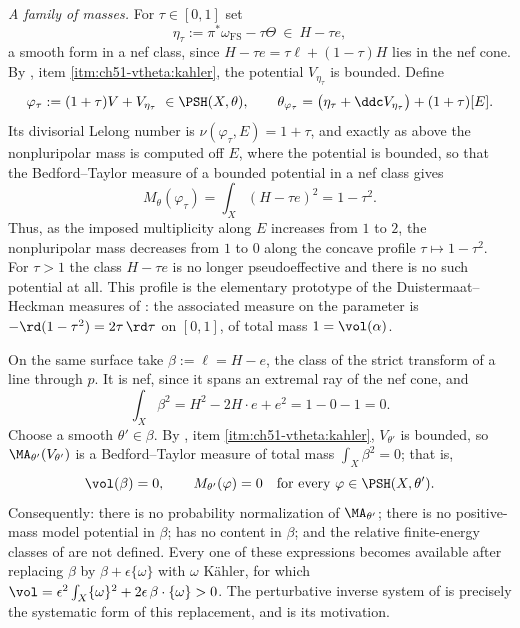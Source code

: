 \begin{example}
\emph{A family of masses.}  For \(\tau\in[0,1]\) set
\[
 \eta_\tau:=\pi^*\omega_{\mathrm{FS}}-\tau\Theta
 \ \in\ H-\tau e ,
\]
a smooth form in a nef class, since \(H-\tau e=\tau\ell+(1-\tau)H\) lies
in the nef cone.  By , item
\cref{itm:ch51-vtheta:kahler}, the potential \(V_{\eta_\tau}\) is bounded.
Define
\[
 \varphi_\tau:=(1+\tau)V+V_{\eta_\tau}\ \in\PSH(X,\theta),
 \qquad
 \theta_{\varphi_\tau}
 =\bigl(\eta_\tau+\ddc V_{\eta_\tau}\bigr)+(1+\tau)[E] .
\]
Its divisorial Lelong number is \(\nu(\varphi_\tau,E)=1+\tau\), and
exactly as above the nonpluripolar mass is computed off \(E\), where the
potential is bounded, so that the Bedford--Taylor measure of a bounded
potential in a nef class gives
\[
 M_\theta(\varphi_\tau)
 =\int_X(H-\tau e)^2
 =1-\tau^2 .
\]
Thus, as the imposed multiplicity along \(E\) increases from \(1\) to
\(2\), the nonpluripolar mass decreases from \(1\) to \(0\) along the
concave profile \(\tau\mapsto1-\tau^2\).  For \(\tau>1\) the class
\(H-\tau e\) is no longer pseudoeffective and there is no such potential
at all.  This profile is the elementary prototype of the
Duistermaat--Heckman measures of
: the associated measure on the
parameter is \(-\rd(1-\tau^2)=2\tau\,\rd\tau\) on \([0,1]\), of total mass
\(1=\vol(\alpha)\).
\end{example}

\begin{example}
\label{ex:ch51-nef-zero-volume}
On the same surface take \(\beta:=\ell=H-e\), the class of the strict
transform of a line through \(p\).  It is nef, since it spans an extremal
ray of the nef cone, and
\[
 \int_X\beta^2=H^2-2H\cdot e+e^2=1-0-1=0 .
\]
Choose a smooth \(\theta'\in\beta\).  By
, item \cref{itm:ch51-vtheta:kahler},
\(V_{\theta'}\) is bounded, so \(\MA_{\theta'}(V_{\theta'})\) is a
Bedford--Taylor measure of total mass \(\int_X\beta^2=0\); that is,
\[
 \vol(\beta)=0,
 \qquad
 M_{\theta'}(\varphi)=0
 \quad\text{for every }\varphi\in\PSH(X,\theta').
\]
Consequently: there is no probability normalization of
\(\MA_{\theta'}\); there is no positive-mass model potential in
\(\beta\);  has no content in \(\beta\);
and the relative finite-energy classes of
 are not defined.  Every one of these
expressions becomes available after replacing \(\beta\) by
\(\beta+\epsilon\{\omega\}\) with \(\omega\) K\"ahler, for which
\(\vol=\epsilon^2\int_X\{\omega\}^2+2\epsilon\,\beta\cdot\{\omega\}>0\).
The perturbative inverse system of
 is precisely the systematic form of
this replacement, and  is its motivation.
\end{example}

